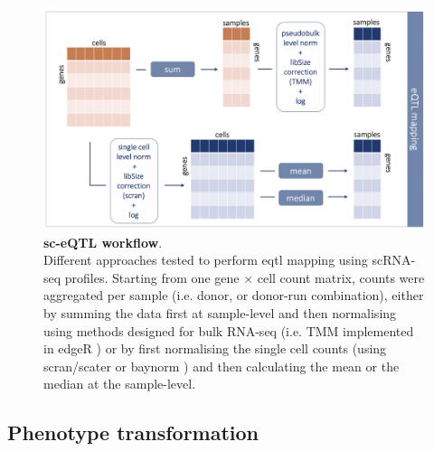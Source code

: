 
\begin{figure}[h]
\centering
\includegraphics[width=15.5cm]{Chapter3/Fig/sc_qtl_workflow_white.png}
\caption[sc-eQTL workflow]{\textbf{sc-eQTL workflow}.\\
Different approaches tested to perform \gls{eqtl} mapping using scRNA-seq profiles.
Starting from one gene $\times$ cell count matrix, counts were aggregated per sample (i.e. donor, or donor-run combination), either by summing the data first at sample-level and then normalising using methods designed for bulk RNA-seq (i.e. TMM implemented in edgeR \cite{robinson2010scaling, robinson2010edger}) or by first normalising the single cell counts (using scran/scater \cite{lun2016pooling, mccarthy2017scater} or baynorm \cite{tang2020baynorm}) and then calculating the mean or the median at the sample-level. }
\label{fig:sc_qtl_workflow}
\end{figure}

\subsection{Phenotype transformation}


